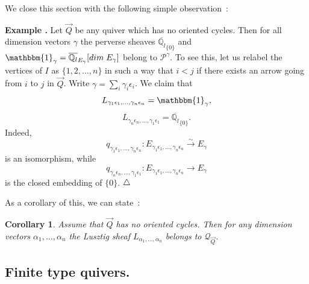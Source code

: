\documentclass[a4paper,10pt]{amsart}
\def\endexample{$\hfill \triangle$}
\def\endexample{$\hfill \triangle$}
\def\a{\alpha}
\def\qlb{\overline{\mathbb{Q}_l}}
\def\QQ{\mathcal{Q}_{\vec{Q}}}
\newtheorem{cor}[theo]{Corollary}
\numberwithin{equation}{section}
\begin{document}
\vspace{.2in}
We close this section with the following simple observation~:

\vspace{.1in}

\addtocounter{theo}{1}
\noindent \textbf{Example \thetheo .} Let $\vec{Q}$ be any quiver which has no oriented cycles. Then for all dimension vectors $\gamma$ the perverse sheaves $\qlb_{\{0\}}$ and $\mathbbm{1}_{\gamma}=\qlb_{E_{\gamma}}[dim\;E_{\gamma}]$ belong to $\mathcal{P}^{\gamma}$. To see this, let us relabel the vertices of $I$ as $\{1, 2, \ldots, n\}$ in such a way that $i<j$ if there exists an arrow going from $i$ to $j$ in $\vec{Q}$. Write $\gamma=\sum_i \gamma_i \epsilon_i$. We claim that 
\begin{equation}
L_{\gamma_1\epsilon_1, \ldots, \gamma_n \epsilon_n} = \mathbbm{1}_{\gamma},
\end{equation}
\begin{equation}
L_{\gamma_n\epsilon_n, \ldots, \gamma_1 \epsilon_1} = \qlb_{\{0\}}.
\end{equation}
Indeed, 
$$q_{\gamma_1\epsilon_1, \ldots, \gamma_n \epsilon_n}: E_{\gamma_1\epsilon_1, \ldots, \gamma_n\epsilon_n} \stackrel{\sim}{\to} E_{\gamma}$$
is an isomorphism, while
$$q_{\gamma_n\epsilon_n, \ldots, \gamma_1 \epsilon_1}: E_{\gamma_1\epsilon_1, \ldots, \gamma_n\epsilon_n} {\to} E_{\gamma}$$
is the closed embedding of $\{0\}$.
\endexample

\vspace{.1in}

As a corollary of this, we can state~:

\vspace{.1in}

\begin{cor} Assume that $\vec{Q}$ has no oriented cycles. Then for \textit{any} dimension vectors $\a_1, \ldots, \a_n$ the Lusztig sheaf $L_{\a_1, \ldots, \a_n} $ belongs to $\QQ$.
\end{cor}


\vspace{.3in}

\subsection{Finite type quivers.}

\vspace{.15in}
\end{document}
